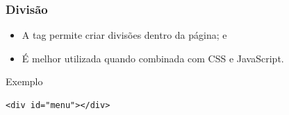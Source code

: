 \documentclass[aspectratio=169]{beamer} %
\begin{document}
\begin{frame}[fragile]
	\frametitle{Divisão}
	
	\begin{itemize}
		\item A tag  permite criar divisões dentro da página; e
		\item É melhor utilizada quando combinada com CSS e JavaScript.
	\end{itemize}\vfill
	
	\begin{exampleblock}{Exemplo}
		\begin{lstlisting}
<div id="menu"></div>
		\end{lstlisting}
	\end{exampleblock}
\end{frame}
\end{document}
